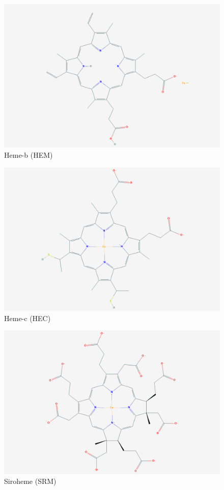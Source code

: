 \documentclass[a4paper, nobind]{templates/ociamthesis}
\begin{document}
\begin{figure}

{\centering \includegraphics[width=0.5\linewidth]{figures/HEM-b} 

}

\caption{Heme-b (HEM)}\label{fig:structHEM}
\end{figure}
\begin{figure}

{\centering \includegraphics[width=0.5\linewidth]{figures/HEM-c} 

}

\caption{Heme-c (HEC)}\label{fig:structHEC}
\end{figure}

\begin{figure}

{\centering \includegraphics[width=0.5\linewidth]{figures/SRM} 

}

\caption{Siroheme (SRM)}\label{fig:structSRM}
\end{figure}
\end{document}
